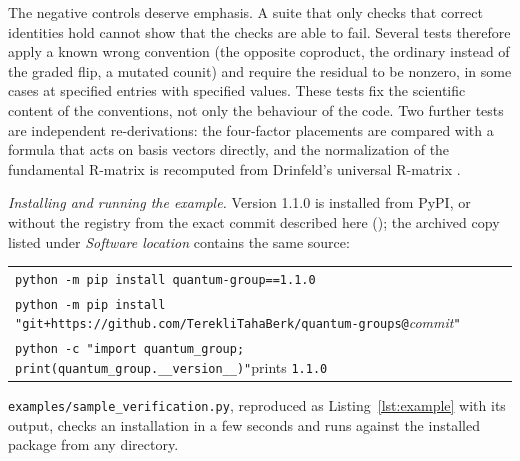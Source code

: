 \documentclass[11pt,a4paper]{article}
\newcommand{\code}[1]{\texttt{#1}}
\begin{document}
The negative controls deserve emphasis. A suite that only checks that correct identities hold cannot show that the checks are able to fail. Several tests therefore apply a known wrong convention (the opposite coproduct, the ordinary instead of the graded flip, a mutated counit) and require the residual to be nonzero, in some cases at specified entries with specified values. These tests fix the scientific content of the conventions, not only the behaviour of the code. Two further tests are independent re-derivations: the four-factor placements are compared with a formula that acts on basis vectors directly, and the normalization of the fundamental R-matrix is recomputed from Drinfeld's universal R-matrix \cite{drinfeld1987}.

\emph{Installing and running the example.} Version 1.1.0 is installed from PyPI, or without the registry from the exact commit described here (\SnapshotSHA); the archived copy listed under \emph{Software location} contains the same source:
\begin{center}\small
\begin{tabular}{@{}l@{}}
\code{python -m pip install quantum-group==1.1.0}\\
\code{python -m pip install "git+https://github.com/TerekliTahaBerk/quantum-groups@}\textit{commit}\code{"}\\
\code{python -c "import quantum\_group; print(quantum\_group.\_\_version\_\_)"}\quad prints \code{1.1.0}
\end{tabular}
\end{center}
\code{examples/sample\_verification.py}, reproduced as Listing~\ref{lst:example} with its output, checks an installation in a few seconds and runs against the installed package from any directory.
\end{document}

